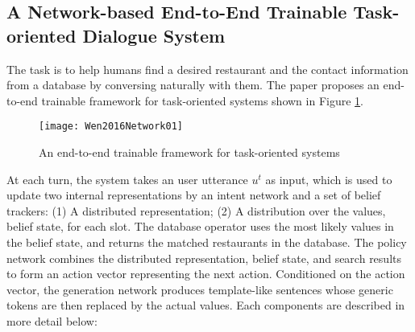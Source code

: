 \subsection{A Network-based End-to-End Trainable Task-oriented Dialogue System \cite{Wen2016}}
The task is to help humans find a desired restaurant and the contact information from a database by conversing naturally with them. The paper proposes an end-to-end trainable framework for task-oriented systems shown in Figure \ref{fig:Wen2016Network01}.

\begin{figure}[htbp]
  \centering
  \texttt{[image: Wen2016Network01]}
  \caption{An end-to-end trainable framework for task-oriented systems}
	\label{fig:Wen2016Network01}
\end{figure}

At each turn, the system takes an user utterance $u^{t}$ as input, which is used to update two internal representations by an intent network and a set of belief trackers: (1) A distributed representation; (2) A distribution over the values, belief state, for each slot. The database operator uses the most likely values in the belief state, and returns the matched restaurants in the database. The policy network combines the distributed representation, belief state, and search results to form an action vector representing the next action. Conditioned on the action vector, the generation network produces template-like sentences whose generic tokens are then replaced by the actual values. Each components are described in more detail below:

